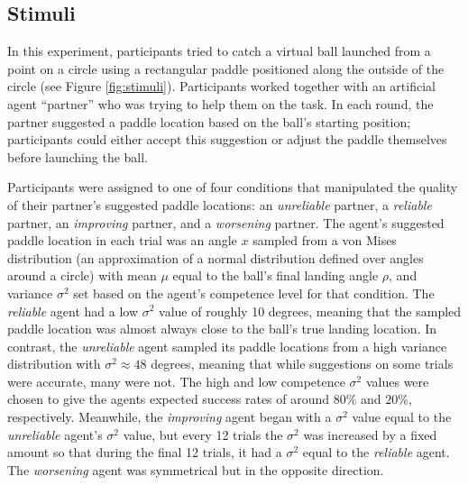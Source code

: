 \documentclass[10pt,letterpaper]{article}
\begin{document}
\subsection{Stimuli}

In this experiment, participants tried to catch a virtual ball launched from a point on a circle using a rectangular paddle positioned along the outside of the circle (see Figure \ref{fig:stimuli}).\footnotemark{} 
Participants worked together with an artificial agent ``partner'' who was trying to help them on the task. In each round, the partner suggested a paddle location based on the ball's starting position; participants could either accept this suggestion or adjust the paddle themselves before launching the ball.


Participants were assigned to one of four conditions that manipulated the quality of their partner's suggested paddle locations: an \textit{unreliable} partner, a \textit{reliable} partner, an \textit{improving} partner, and a \textit{worsening} partner. The agent's
suggested paddle location in each trial was an angle $x$ sampled from a von Mises distribution (an approximation of a normal distribution defined over angles around a circle) with mean $\mu$ equal to the ball's final landing angle $\rho$, and variance $\sigma^2$ set based on the agent's competence level for that condition. The \textit{reliable} agent had a low $\sigma^2$ value of roughly 10 degrees, meaning that the sampled paddle location was almost always close to the ball's true landing location. In contrast, the \textit{unreliable} agent sampled its paddle locations from a high variance distribution with $\sigma^2 \approx 48$ degrees, meaning that while suggestions on some trials were accurate, many were not. The high and low competence $\sigma^2$ values were chosen to give the agents expected success rates of around $80\%$ and $20\%$, respectively. Meanwhile, the \textit{improving} agent began with a $\sigma^2$ value equal to the \textit{unreliable} agent's $\sigma^2$ value, but every 12 trials the $\sigma^2$ was increased by a fixed amount so that during the final 12 trials, it had a $\sigma^2$ equal to the \textit{reliable} agent. The \textit{worsening} agent was symmetrical but in the opposite direction.
\end{document}

